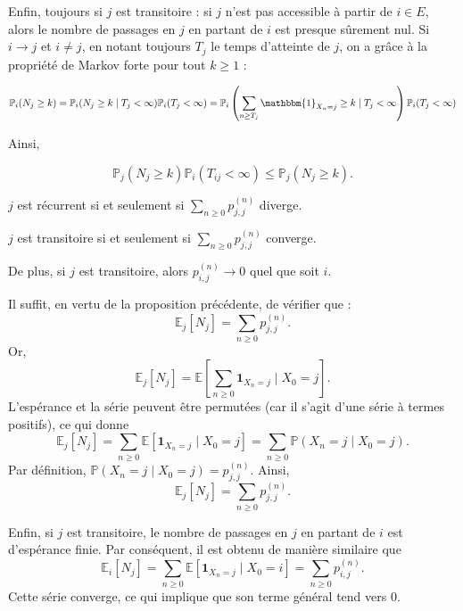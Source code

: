 \begin{sloppypar}
Enfin, toujours si $j$ est transitoire : si $j$ n’est pas accessible à partir de $i \in E$, alors le nombre de passages
en $j$ en partant de $i$ est presque sûrement nul. Si $i \rightarrow j$ et $i \neq j$, en notant toujours $T_j$ le temps d’atteinte de $j$, on a grâce à la propriété de Markov forte pour tout $k \geq 1$ :

\begin{equation}
\mathbb{P}_i(N_j \geq k) = \mathbb{P}_i(N_j \geq k \mid T_j < \infty) \mathbb{P}_i(T_j < \infty) = \mathbb{P}_i \left( \sum_{n \geq T_j} \mathbbm{1}_{X_n = j} \geq k \mid T_j < \infty \right) \mathbb{P}_i(T_j < \infty)
\end{equation}

Ainsi,

\begin{equation}
\mathbb{P}_j(N_j \geq k) \mathbb{P}_i(T_{ij} < \infty) \leq \mathbb{P}_j(N_j \geq k).    
\end{equation}

\begin{tcolorbox}[colback=yellow!5!white,colframe=yellow!75!black, title=Corollaire]
$j$ est récurrent si et seulement si $\displaystyle{\sum_{n \geq 0}} p^{(n)}_{j,j}$ diverge.

$j$ est transitoire si et seulement si $\displaystyle{\sum_{n \geq 0}} p^{(n)}_{j,j}$ converge.

De plus, si $j$ est transitoire, alors $p^{(n)}_{i,j} \to 0$ quel que soit $i$.
\end{tcolorbox}

Il suffit, en vertu de la proposition précédente, de vérifier que :
\[
\mathbb{E}_j[N_j] = \sum_{n \geq 0} p^{(n)}_{j,j}.
\]
Or, 
\[
\mathbb{E}_j[N_j] = \mathbb{E}\left[\sum_{n \geq 0} \mathbf{1}_{X_n = j} \mid X_0 = j\right].
\]
L'espérance et la série peuvent être permutées (car il s'agit d'une série à termes positifs), ce qui donne
\[
\mathbb{E}_j[N_j] = \sum_{n \geq 0} \mathbb{E}\left[\mathbf{1}_{X_n = j} \mid X_0 = j\right] = \sum_{n \geq 0} \mathbb{P}(X_n = j \mid X_0 = j).
\]
Par définition, $\mathbb{P}(X_n = j \mid X_0 = j) = p^{(n)}_{j,j}$. Ainsi, 
\[
\mathbb{E}_j[N_j] = \sum_{n \geq 0} p^{(n)}_{j,j}.
\]

Enfin, si $j$ est transitoire, le nombre de passages en $j$ en partant de $i$ est d'espérance finie. Par conséquent, il est obtenu de manière similaire que 
\[
\mathbb{E}_i[N_j] = \sum_{n \geq 0} \mathbb{E}\left[\mathbf{1}_{X_n = j} \mid X_0 = i\right] = \sum_{n \geq 0} p^{(n)}_{i,j}.
\]
Cette série converge, ce qui implique que son terme général tend vers $0$.



\end{sloppypar}
